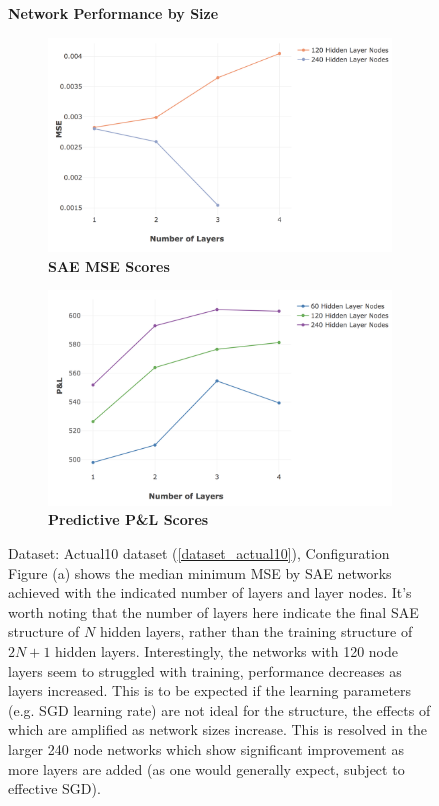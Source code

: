 \documentclass[a4paper,11pt,oneside]{article}
\theoremstyle{plain}
\theoremstyle{definition}
\begin{document}
\begin{figure}[H]
	\centering
	\textbf{Network Performance by Size}
	\begin{subfigure}{.5\textwidth}
		\centering 
		\includegraphics[scale=0.25]{images/results/network/actual_mse_lines.png}
		\caption{\textbf{SAE MSE Scores} 
			\newline }
		\label{figure-actual_mse_lines}
	\end{subfigure}%
	\begin{subfigure}{.5\textwidth}
		\centering 
		\includegraphics[scale=0.26]{images/results/network/actual_pl_lines.png}
		\caption{\textbf{Predictive P\&L Scores} 
			\newline }
		\label{figure-actual_pl_lines}
	\end{subfigure}
	\caption{Dataset: Actual10 dataset (\ref{dataset_actual10}), Configuration 
		\newline Figure (a) shows the median minimum MSE by SAE networks achieved with the indicated number of layers and layer nodes. It's worth noting that the number of layers here indicate the final SAE structure of $N$ hidden layers, rather than the training structure of $2N + 1$ hidden layers. Interestingly, the networks with 120 node layers seem to struggled with training, performance decreases as layers increased. This is to be expected if the learning parameters (e.g. SGD  learning rate) are not ideal for the structure, the effects of which are amplified as network sizes increase. This is resolved in the larger 240 node networks which show significant improvement as more layers are added (as one would generally expect, subject to effective SGD).
}
\end{figure}
\end{document}

